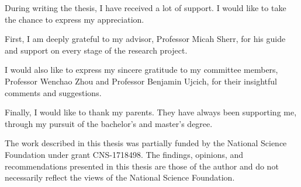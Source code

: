 \documentclass[12pt]{report}
\begin{document}
During writing the thesis, I have received a lot of support. I would like to take the chance to express my appreciation.

First, I am deeply grateful to my advisor, Professor Micah Sherr, for his guide and support on every stage of the research project. 

I would also like to express my sincere gratitude to my committee members, Professor Wenchao Zhou and Professor Benjamin Ujcich, for their insightful comments and suggestions. 

Finally, I would like to thank my parents. They have always been supporting me, through my pursuit of the bachelor's and master's degree.

The work described in this thesis was partially funded by the National Science Foundation under grant CNS-1718498.  The findings, opinions, and recommendations presented in this thesis are those of the author and do not necessarily reflect the views of the National Science Foundation.





\tableofcontents

\listoffigures  %

\newpage
















%




\typeout{***}
\typeout{***}
\end{document}
